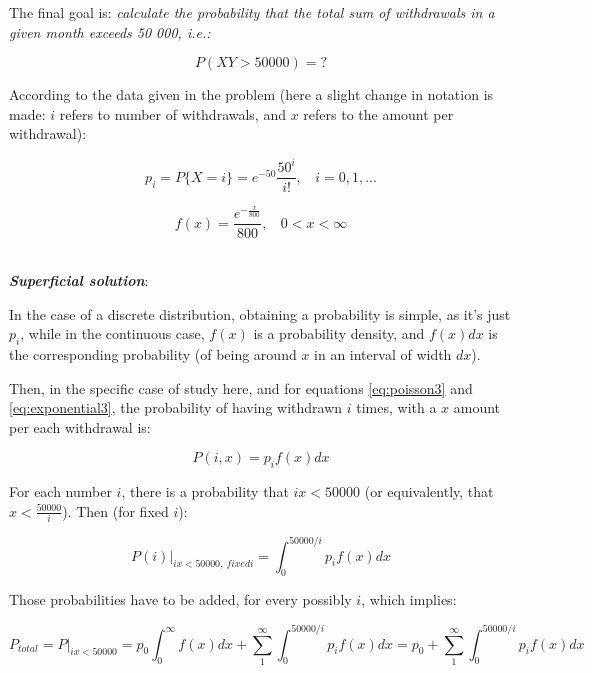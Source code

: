 \documentclass[paper=a4, fontsize=11pt]{scrartcl} %
\numberwithin{equation}{section} %
\numberwithin{figure}{section} %
\numberwithin{table}{section} %
\begin{document}
The final goal is: \textit{calculate the probability that the total sum of withdrawals in a given month exceeds 50 000, i.e.:}

\begin{equation}
P(XY>50000)=?
\end{equation}

According to the data given in the problem (here a slight change in notation is made: $i$ refers to number of withdrawals, and $x$ refers to the amount per withdrawal):

\begin{equation}
p_{i} = P\{ X = i \} = e^{-50}\frac{50^{i}}{i!}, \ \ \ \ i = 0, 1, ...
\label{eq:poisson3}
\end{equation}

\begin{equation}
f(x) = \frac{e^{-\frac{x}{800}}}{800}, \ \ \ \ 0<x<\infty
\label{eq:exponential3}
\end{equation}



\ \\
\textit{\textbf{Superficial solution}}:

In the case of a discrete distribution, obtaining a probability is simple, as it's just $p_{i}$, while in the continuous case, $f(x)$ is a probability density, and $f(x)dx$ is the corresponding probability (of being around $x$ in an interval of width $dx$).

Then, in the specific case of study here, and for equations \ref{eq:poisson3} and \ref{eq:exponential3}, the probability  of having withdrawn $i$ times, with a $x$ amount per each withdrawal is:

\begin{equation}
P(i, x) = p_{i}f(x)dx
\label{eq:total_prob1}
\end{equation}

For each number $i$, there is a probability that $i x < 50000$ (or equivalently, that $x<\frac{50000}{i}$). Then (for fixed $i$):


\begin{equation}
P(i)|_{ix<50000, \ fixed i} = \int_{0}^{50000/i}p_{i}f(x)dx
\label{eq:total_prob2}
\end{equation}

Those probabilities have to be added, for every possibly $i$, which implies:


\begin{equation}
P_{total} = P|_{ix<50000} = p_{0}\int_{0}^{\infty}f(x)dx+\sum_{1}^{\infty}\int_{0}^{50000/i}p_{i}f(x)dx = p_{0}+\sum_{1}^{\infty}\int_{0}^{50000/i}p_{i}f(x)dx
\label{eq:total_prob3}
\end{equation}
\end{document}
